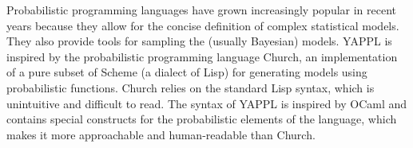 Probabilistic programming languages have grown increasingly popular in recent years 
because they allow for the concise definition of complex statistical models. They also 
provide tools for sampling the (usually Bayesian) models. YAPPL is inspired by the 
probabilistic programming language Church, an implementation of a pure subset of Scheme 
(a dialect of Lisp) for generating models using probabilistic functions. Church relies 
on the standard Lisp syntax, which is unintuitive and difficult to read. The syntax of 
YAPPL is inspired by OCaml and contains special constructs for the probabilistic 
elements of the language, which makes it more approachable and human-readable than Church. 